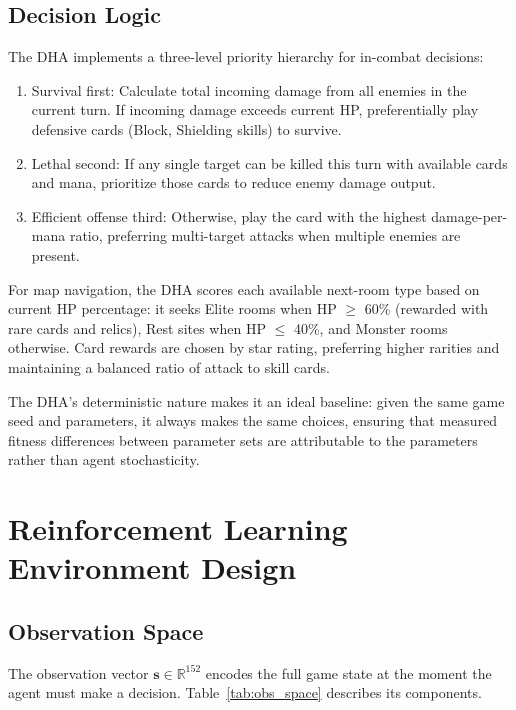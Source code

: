 \subsection{Decision Logic}

The DHA implements a three-level priority hierarchy for in-combat decisions:

\begin{enumerate}
    \item Survival first: Calculate total incoming damage from all enemies in the current turn. If incoming damage exceeds current HP, preferentially play defensive cards (Block, Shielding skills) to survive.
    \item Lethal second: If any single target can be killed this turn with available cards and mana, prioritize those cards to reduce enemy damage output.
    \item Efficient offense third: Otherwise, play the card with the highest damage-per-mana ratio, preferring multi-target attacks when multiple enemies are present.
\end{enumerate}

For map navigation, the DHA scores each available next-room type based on current HP percentage: it seeks Elite rooms when HP $\geq$ 60\% (rewarded with rare cards and relics), Rest sites when HP $\leq$ 40\%, and Monster rooms otherwise. Card rewards are chosen by star rating, preferring higher rarities and maintaining a balanced ratio of attack to skill cards.

The DHA's deterministic nature makes it an ideal baseline: given the same game seed and parameters, it always makes the same choices, ensuring that measured fitness differences between parameter sets are attributable to the parameters rather than agent stochasticity.

\section{Reinforcement Learning Environment Design}

\subsection{Observation Space}

The observation vector $\mathbf{s} \in \mathbb{R}^{152}$ encodes the full game state at the moment the agent must make a decision. Table~\ref{tab:obs_space} describes its components.

